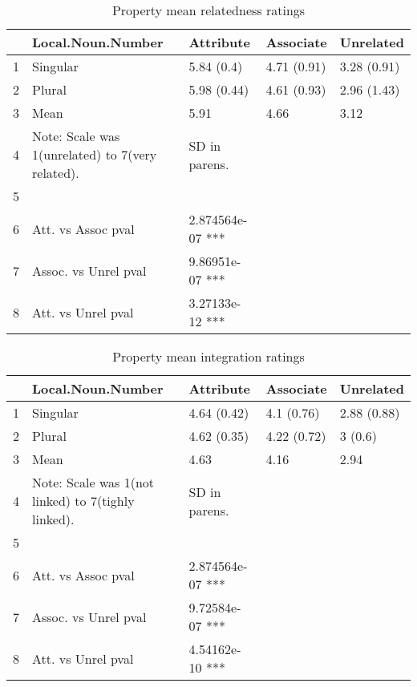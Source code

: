 \documentclass[a4paper,11pt]{article}\usepackage[]{graphicx}\usepackage[]{color}
\begin{document}
\begin{landscape}
\begin{table}[ht]
\centering
\begin{tabular}{rllll}
  \hline
 & Local.Noun.Number & Attribute & Associate & Unrelated \\ 
  \hline
1 & Singular & 5.84 (0.4) & 4.71 (0.91) & 3.28 (0.91) \\ 
  2 & Plural & 5.98 (0.44) & 4.61 (0.93) & 2.96 (1.43) \\ 
  3 & Mean & 5.91 & 4.66 & 3.12 \\ 
  4 & Note: Scale was 1(unrelated) to 7(very related). & SD in parens. &  &  \\ 
  5 &  &  &  &  \\ 
  6 & Att. vs Assoc pval & 2.874564e-07 *** &  &  \\ 
  7 & Assoc. vs Unrel pval & 9.86951e-07 *** &  &  \\ 
  8 & Att. vs Unrel pval & 3.27133e-12 *** &  &  \\ 
   \hline
\end{tabular}
\caption[PROP Relatedness]{Property mean relatedness ratings} 
\end{table}


\begin{table}[ht]
\centering
\begin{tabular}{rllll}
  \hline
 & Local.Noun.Number & Attribute & Associate & Unrelated \\ 
  \hline
1 & Singular & 4.64 (0.42) & 4.1 (0.76) & 2.88 (0.88) \\ 
  2 & Plural & 4.62 (0.35) & 4.22 (0.72) & 3 (0.6) \\ 
  3 & Mean & 4.63 & 4.16 & 2.94 \\ 
  4 & Note: Scale was 1(not linked) to 7(tighly linked). & SD in parens. &  &  \\ 
  5 &  &  &  &  \\ 
  6 & Att. vs Assoc pval & 2.874564e-07 *** &  &  \\ 
  7 & Assoc. vs Unrel pval & 9.72584e-07 *** &  &  \\ 
  8 & Att. vs Unrel pval & 4.54162e-10 *** &  &  \\ 
   \hline
\end{tabular}
\caption[PROP Integration]{Property mean integration ratings} 
\end{table}



\end{landscape}
\end{document}

